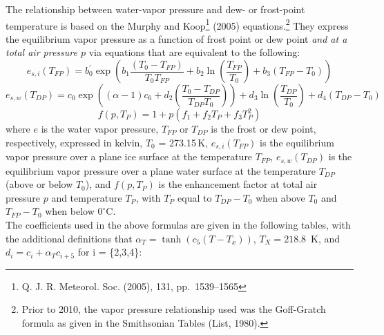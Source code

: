 \documentclass[
]{book}
\begin{document}
The relationship between water-vapor pressure and dew- or frost-point temperature is based on the Murphy and Koop\footnote{Q. J. R. Meteorol. Soc. (2005), 131, pp.~1539--1565}
(2005) equations.\footnote{Prior to 2010, the vapor pressure relationship used was the Goff-Gratch formula as given in the Smithsonian Tables (List, 1980).}
They express the equilibrium vapor pressure as a function of frost point or dew point \emph{and at a total air pressure \(p\)} via equations that are equivalent to the following:\\
\begin{equation}
e_{s,i}(T_{FP})= b_{0}^{\prime}\exp(b_{1}\frac{(T_{0}-T_{FP})}{T_{0}T_{FP}}+b_{2}\ln(\frac{T_{FP}}{T_{0}})+b_{3}(T_{FP}-T_{0}))
\label{eq:MKi}
\end{equation}
\begin{equation}
e_{s,w}(T_{DP})=c_{0}\exp\left((\alpha-1)c_{6}+d_{2}(\frac{T_{0}-T_{DP}}{T_{DP}T_{0}})\right)+d_{3}\ln(\frac{T_{DP}}{T_{0}})+d_{4}(T_{DP}-T_{0})
\label{eq:MKw}
\end{equation}
\begin{equation}
f(p, T_P)= 1 + p(f_1 + f_2T_P + f_3T_P^2)
\label{eq:enhance}
\end{equation}
where \(e\) is the water vapor pressure, \(T_{FP}\) or \(T_{DP}\) is the frost or dew point, respectively, expressed in kelvin, \(T_0\) = 273.15 K, \(e_{s,i}(T_{FP})\) is the equilibrium vapor pressure over a plane ice surface at the temperature \(T_{FP}\), \(e_{s,w}(T_{DP})\) is the equilibrium vapor pressure over a plane water surface at the temperature \(T_{DP}\) (above or below \(T_0\)), and \(f(p,T_P)\) is the enhancement factor at total air pressure \(p\) and temperature \(T_P\), with \(T_P\) equal to \(T_{DP}−T_0\) when above \(T_0\) and \(T_{FP}−T_0\) when below \(0^\circ\)C.\\
The coefficients used in the above formulas are given in the following tables, with the additional definitions that \(\alpha_T=\tanh(c_5(T-T_x))\), \(T_X=218.8\)~K, and \(d_i=c_i+\alpha_Tc_{i+5}\) for i = \{2,3,4\}:
\end{document}
